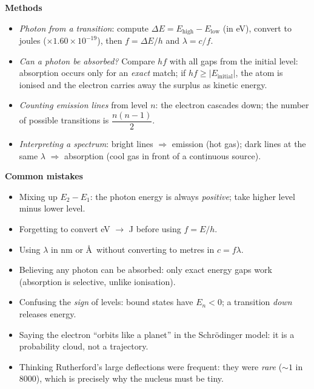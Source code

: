 \documentclass[11pt]{article}
\begin{document}
\begin{aretenir}
\textbf{Methods}
\begin{itemize}
\item \emph{Photon from a transition}: compute $\Delta E = E_{\text{high}} - E_{\text{low}}$ (in eV), convert to joules ($\times 1.60\times10^{-19}$), then $f = \Delta E/h$ and $\lambda = c/f$.
\item \emph{Can a photon be absorbed?} Compare $hf$ with all gaps from the initial level: absorption occurs only for an \emph{exact} match; if $hf \geq |E_{\text{initial}}|$, the atom is ionised and the electron carries away the surplus as kinetic energy.
\item \emph{Counting emission lines} from level $n$: the electron cascades down; the number of possible transitions is $\dfrac{n(n-1)}{2}$.
\item \emph{Interpreting a spectrum}: bright lines $\Rightarrow$ emission (hot gas); dark lines at the same $\lambda$ $\Rightarrow$ absorption (cool gas in front of a continuous source).
\end{itemize}

\textbf{Common mistakes}
\begin{itemize}
\item Mixing up $E_2 - E_1$: the photon energy is always \emph{positive}; take higher level minus lower level.
\item Forgetting to convert eV $\to$ J before using $f = E/h$.
\item Using $\lambda$ in nm or \AA\ without converting to metres in $c = f\lambda$.
\item Believing any photon can be absorbed: only exact energy gaps work (absorption is selective, unlike ionisation).
\item Confusing the \emph{sign} of levels: bound states have $E_n < 0$; a transition \emph{down} releases energy.
\item Saying the electron ``orbits like a planet'' in the Schr\"odinger model: it is a probability cloud, not a trajectory.
\item Thinking Rutherford's large deflections were frequent: they were \emph{rare} ($\sim 1$ in $8000$), which is precisely why the nucleus must be tiny.
\end{itemize}


\end{aretenir}
\end{document}
